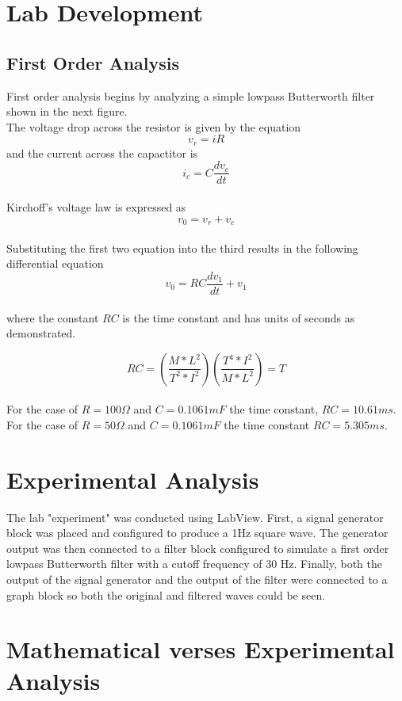 \documentclass[main.tex]{subfiles}
\begin{document}
	\section[Lab Development]{Lab Development}
	\subsection[First Order Analysis]{First Order Analysis}
	
	First order analysis begins by analyzing a simple lowpass Butterworth filter shown in the next figure.
	\\
	The voltage drop across the resistor is given by the equation
	\[v_{r} = iR\] and the current across the capactitor is 
	\[i_{c} = C \frac{d v_{c}}{dt}\]
	\\Kirchoff's voltage law is expressed as
	\[v_{0} = v_{r} + v_{c}\]
	\\
	Substituting the first two equation into the third results in the following differential equation
	\[v_{0} = RC \frac{d v_{1}}{dt} + v_{1}\]
	\\where the constant \(RC\) is the time constant and has units of seconds as demonstrated.
	
	
	\[RC = (\frac{M * L^2}{T^2 * I^2} )(\frac{T^4 * I^2}{M * L^2}) = T\]
	\\
	For the case of \(R = 100\Omega\) and \(C = 0.1061 mF\) the time constant, \(RC = 10.61 ms\). For the case of \(R=50\Omega\) and \(C=0.1061mF\) the time constant \(RC=5.305ms\).
	
	\section{Experimental Analysis}
	The lab "experiment" was conducted using LabView. First, a signal generator block was placed and configured to produce a 1Hz square wave. The generator output was then connected to a filter block configured to simulate a first order lowpass Butterworth filter with a cutoff frequency of 30 Hz. Finally, both the output of the signal generator and the output of the filter were connected to a graph block so both the original and filtered waves could be seen.
	
	\section{Mathematical verses Experimental Analysis}
	
	
\end{document}
